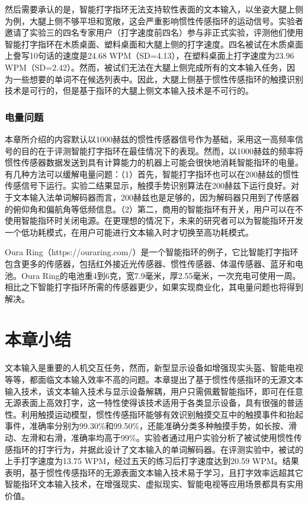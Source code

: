 然后需要承认的是，智能打字指环无法支持软性表面的文本输入，以坐姿大腿上侧为例，大腿上侧不够平坦和宽敞，这会严重影响惯性传感指环的运动信号。实验者邀请了实验三的四名专家用户（打字速度前四名）参与非正式实验，评测他们使用智能打字指环在木质桌面、塑料桌面和大腿上侧的打字速度。四名被试在木质桌面上誊写10句话的速度是24.68 WPM（SD=4.13），在塑料桌面上打字速度为23.96 WPM（SD=2.42）。然而，被试们无法在大腿上侧完成所有的文本输入任务，因为一些想要的单词不在候选列表中。因此，大腿上侧基于惯性传感指环的触摸识别技术是可行的，但是基于指环的大腿上侧文本输入技术是不可行的。

\subsubsection{电量问题}

本章所介绍的内容默认以1000赫兹的惯性传感器信号作为基础，采用这一高频率信号的目的在于评测智能打字指环在最佳情况下的表现。然而，以1000赫兹的频率将惯性传感器数据发送到具有计算能力的机器上可能会很快地消耗智能指环的电量。有几种方法可以缓解电量问题：（1）首先，智能打字指环也可以在200赫兹的惯性传感信号下运行。实验二结果显示，触摸手势识别算法在200赫兹下运行良好。对于文本输入法单词解码器而言，200赫兹也是足够的，因为解码器只用到了传感器的俯仰角和偏航角等低频信息。（2）第二，商用的智能指环有开关，用户可以在不使用智能指环时关闭电源。在更理想的情况下，未来的研究者可以为智能指环开发一个低功耗模式，在用户可能进行文本输入时才切换至高功耗模式。

Oura Ring（https://ouraring.com/）是一个智能指环的例子，它比智能打字指环包含更多的传感器，包括红外接近光传感器、惯性传感器、体温传感器、蓝牙和电池。Oura Ring的电池重4到6克，宽7.9毫米，厚2.55毫米，一次充电可使用一周。相比之下智能打字指环所需的传感器更少，如果实现商业化，其电量问题也将得到解决。

\section{本章小结}

文本输入是重要的人机交互任务，然而，新型显示设备如增强现实头盔、智能电视等等，都面临文本输入效率不高的问题。本章提出了基于惯性传感指环的无源文本输入技术，该文本输入技术与显示设备解耦，用户只需佩戴智能指环，即可在任意无源表面上高效打字，这一特性使得该技术适用于各类显示设备，具有很强的普适性。利用触摸运动模型，惯性传感指环能够有效识别触摸交互中的触摸事件和抬起事件，准确率分别为99.30\%和99.50\%，还能准确分类多种触摸手势，如长按、滑动、左滑和右滑，准确率均高于99\%。实验者通过用户实验分析了被试使用惯性传感指环的打字行为，并据此设计了文本输入的单词解码器。在评测实验中，被试的上手打字速度为13.75 WPM，经过五天的练习后打字速度达到20.59 WPM。结果表明，基于惯性传感指环的无源表面文本输入技术易于学习，且打字效率远超其它智能指环文本输入技术，在增强现实、虚拟现实、智能电视等应用场景都具有实用价值。

